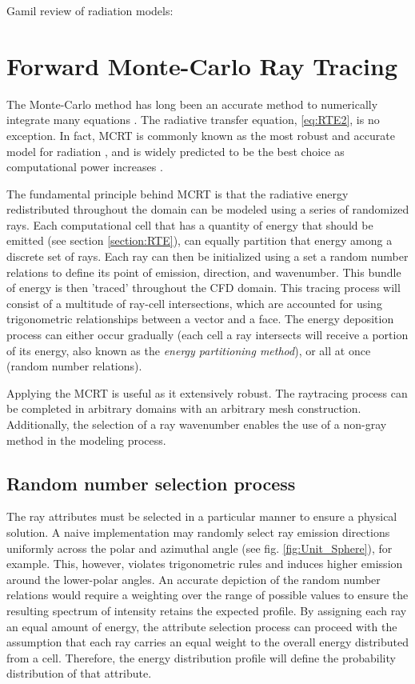 Gamil review of radiation models: \cite{Gamil2020AssessmentChamber}

\section{Forward Monte-Carlo Ray Tracing}
The Monte-Carlo method has long been an accurate method to numerically integrate many equations \cite{Howell2021TheTransfer}. 
The radiative transfer equation, \ref{eq:RTE2}, is no exception. In fact, 
MCRT is commonly known as the most robust and accurate model for radiation \cite{Tesse2002RadiativeApproach}, and is widely predicted to be the best choice as computational power increases \cite{Liu2020TheFlames,Howell2021TheTransfer}.

The fundamental principle behind MCRT is that the radiative energy redistributed throughout the domain can be modeled using a series of randomized rays. 
Each computational cell that has a quantity of energy that should be emitted (see section \ref{section:RTE}), can equally partition that energy among a discrete set of rays.
Each ray can then be initialized using a set a random number relations to define its point of emission, direction, and wavenumber.
This bundle of energy is then 'traced' throughout the CFD domain. This tracing process will consist of a multitude of ray-cell intersections, which are accounted for using trigonometric relationships between a vector and a face.
The energy deposition process can either occur gradually (each cell a ray intersects will receive a portion of its energy, also known as the \textit{energy partitioning method}), or all at once (random number relations).

Applying the MCRT is useful as it extensively robust. The raytracing process can be completed in arbitrary domains with an arbitrary mesh construction. Additionally, the selection of a ray wavenumber enables the use of a non-gray method in the modeling process.

\subsection{Random number selection process}  \label{section:randomnumberrelations}
The ray attributes must be selected in a particular manner to ensure a physical solution. A naive implementation may randomly select ray emission directions uniformly across the polar and azimuthal angle (see fig. \ref{fig:Unit_Sphere}), for example. This, however, violates trigonometric rules and induces higher emission around the lower-polar angles. 
An accurate depiction of the random number relations would require a weighting over the range of possible values to ensure the resulting spectrum of intensity retains the expected profile. 
By assigning each ray an equal amount of energy, the attribute selection process can proceed with the assumption that each ray carries an equal weight to the overall energy distributed from a cell.
Therefore, the energy distribution profile will define the probability distribution of that attribute.

